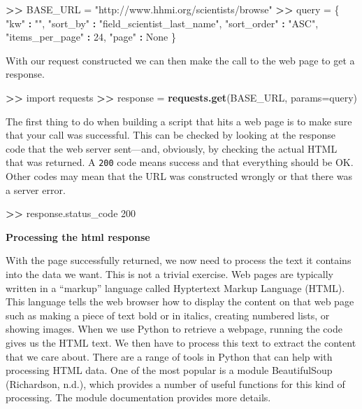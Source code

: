 \documentclass[]{krantz}
\newenvironment{Shaded}{\begin{snugshade}}{\end{snugshade}}
\newcommand{\KeywordTok}[1]{\textcolor[rgb]{0.13,0.29,0.53}{\textbf{#1}}}
\newcommand{\DataTypeTok}[1]{\textcolor[rgb]{0.13,0.29,0.53}{#1}}
\newcommand{\DecValTok}[1]{\textcolor[rgb]{0.00,0.00,0.81}{#1}}
\newcommand{\StringTok}[1]{\textcolor[rgb]{0.31,0.60,0.02}{#1}}
\newcommand{\OperatorTok}[1]{\textcolor[rgb]{0.81,0.36,0.00}{\textbf{#1}}}
\newcommand{\ErrorTok}[1]{\textcolor[rgb]{0.64,0.00,0.00}{\textbf{#1}}}
\newcommand{\NormalTok}[1]{#1}
\begin{document}
\begin{Shaded}
\begin{Highlighting}[]
\OperatorTok{>}\ErrorTok{>}\StringTok{ }\NormalTok{BASE_URL =}\StringTok{ "http://www.hhmi.org/scientists/browse"}
\OperatorTok{>}\ErrorTok{>}\StringTok{ }\NormalTok{query =}\StringTok{ }\NormalTok{\{}
            \StringTok{"kw"} \OperatorTok{:}\StringTok{ ""}\NormalTok{,}
            \StringTok{"sort_by"} \OperatorTok{:}\StringTok{ "field_scientist_last_name"}\NormalTok{,}
            \StringTok{"sort_order"} \OperatorTok{:}\StringTok{ "ASC"}\NormalTok{,}
            \StringTok{"items_per_page"} \OperatorTok{:}\StringTok{ }\DecValTok{24}\NormalTok{,}
            \StringTok{"page"} \OperatorTok{:}\StringTok{ }\NormalTok{None}
\NormalTok{           \}}
\end{Highlighting}
\end{Shaded}

With our request constructed we can then make the call to the web page
to get a response.

\begin{Shaded}
\begin{Highlighting}[]
\OperatorTok{>}\ErrorTok{>}\StringTok{ }\NormalTok{import requests}
\OperatorTok{>}\ErrorTok{>}\StringTok{ }\NormalTok{response =}\StringTok{ }\KeywordTok{requests.get}\NormalTok{(BASE_URL, }\DataTypeTok{params=}\NormalTok{query)}
\end{Highlighting}
\end{Shaded}

The first thing to do when building a script that hits a web page is to
make sure that your call was successful. This can be checked by looking
at the response code that the web server sent---and, obviously, by
checking the actual HTML that was returned. A \texttt{200} code means
success and that everything should be OK. Other codes may mean that the
URL was constructed wrongly or that there was a server error.

\begin{Shaded}
\begin{Highlighting}[]
\OperatorTok{>}\ErrorTok{>}\StringTok{ }\NormalTok{response.status_code}
\DecValTok{200}
\end{Highlighting}
\end{Shaded}

\textbf{Processing the html response}

With the page successfully returned, we now need to process the text it
contains into the data we want. This is not a trivial exercise. Web
pages are typically written in a ``markup'' language called Hyptertext
Markup Language (HTML). This language tells the web browser how to
display the content on that web page such as making a piece of text bold
or in italics, creating numbered lists, or showing images. When we use
Python to retrieve a webpage, running the code gives us the HTML text.
We then have to process this text to extract the content that we care
about. There are a range of tools in Python that can help with
processing HTML data. One of the most popular is a module BeautifulSoup
(Richardson, n.d.), which provides a number of useful functions for this
kind of processing. The module documentation provides more details.
\end{document}
